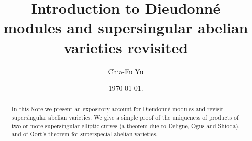 \documentclass[]{amsart}
\theoremstyle{plain}
\theoremstyle{definition}
\theoremstyle{remark}
\newcommand{\<}{\langle}   %
\renewcommand{\>}{\rangle} %
\newcommand{\dieu}{Dieudonn\'{e} }
\begin{document}
\renewcommand{\thefootnote}{\fnsymbol{footnote}}
\setcounter{footnote}{-1}


\title[Dieudonn\'e modules and supersingular abelian varieties]{Introduction to Dieudonn\'e modules and supersingular abelian varieties revisited}
\author{Chia-Fu Yu}
\address{
Institute of Mathematics, Academia Sinica \\
Astronomy Mathematics Building \\
No.~1, Roosevelt Rd. Sec.~4 \\ 
Taipei, Taiwan, 10617} 






\date{\today. }
\subjclass[2010]{} 
\keywords{}


\begin{abstract}
In this Note we present an expository account for \dieu modules and
revisit supersingular abelian varieties. We give a simple proof of
the uniqueness of products of two or more supersingular elliptic
curves (a theorem due to Deligne, Ogus and Shioda), and of Oort's theorem for superspecial abelian varieties. 
\end{abstract} 

\maketitle
\end{document}

